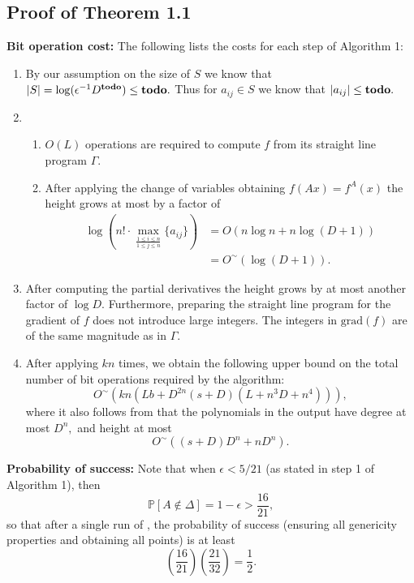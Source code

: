 \documentclass[sigconf]{acmart}
\def\td{{\bf todo}}
\def\pr{\mathbb{P}}
\def\grad{\textrm{grad}}
\def\D{\Delta}
\begin{document}
\subsection{Proof of Theorem 1.1}
%
\textbf{Bit operation cost:} The following lists the costs for each step of Algorithm 1:
%
\begin{enumerate}
    \item By our assumption on the size of $S$ we know that $|S| = \log (\epsilon^{-1}D^{\td}) \leq \td.$ Thus for $a_{ij} \in S$ we know that $|a_{ij}| \leq \td.$
    \item 
    \begin{enumerate}[label=\roman*.]
        \item $O(L)$ operations are required to compute $f$ from its straight line program $\Gamma.$
        \item After applying the change of variables obtaining $f(A x)=f^A(x)$ the height grows at most by a factor of
        \begin{align*}
        \log(n!\cdot \max_{\frac{1\leq i\leq n}{1\leq j\leq n}}\{a_{ij}\}) &= 
        O(n\log n + n\log(D+1)) \\
        &= 
        O^\sim(\log(D+1)).
        \end{align*}
    \end{enumerate}
    \item After computing the partial derivatives the height grows by at most another factor of $\log D$. Furthermore, preparing the straight line program for the gradient of $f$ does not introduce large integers. The integers in $\grad (f)$ are of the same magnitude as in $\Gamma$.
    \item 
    After applying \cite[Algorithm 2]{SH} $kn$ times, we obtain the
    following upper bound on the total number of bit operations required by the algorithm:
    \[
    O^\sim(kn(Lb+D^{2n}(s+D)(L+n^3D+n^4))),
    \]
    where it also follows from \cite[Algorithm 2]{SH} that the polynomials in the output have degree at most $D^n,$ and height at most
    \[
    O^{\sim}((s+D)D^n + nD^n).
    \]
\end{enumerate}
%
\par \noindent 
\textbf{Probability of success:} Note that when $\epsilon < 5/21$ (as stated in step 1 of Algorithm 1), then
\[
\pr[A \not \in \D] = 1-\epsilon > \frac{16}{21},
\]
so that after a single run of \cite[Algorithm 2]{SH}, the probability of success (ensuring all genericity properties and obtaining all points) is at least 
\[
\left( \frac{16}{21} \right) \left( \frac{21}{32} \right) = \frac{1}{2}.
\]
\end{document}
